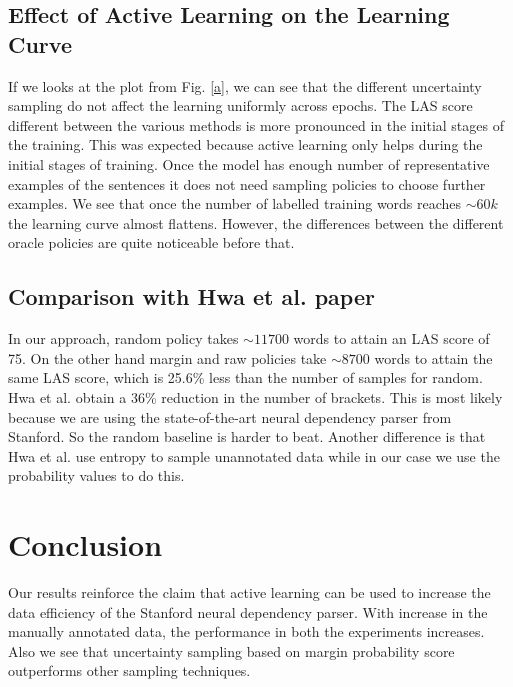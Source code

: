 \documentclass[11pt,letterpaper]{article}
\begin{document}
\subsection{Effect of Active Learning on the Learning Curve}
If we looks at the plot from Fig. \ref{a}, we can see that the different uncertainty sampling do not affect the learning uniformly across epochs. The LAS score different between the various methods is more pronounced in the initial stages of the training. This was expected because active learning only helps during the initial stages of training. Once the model has enough number of representative examples of the sentences it does not need sampling policies to choose further examples. We see that once the number of labelled training words reaches $\sim60k$ the learning curve almost flattens. However, the differences between the different oracle policies are quite noticeable before that.

\subsection{Comparison with Hwa et al. paper}
In our approach, random policy takes $\sim11700$ words to attain an LAS score of 75. On the other hand margin and raw policies take $\sim8700$ words to attain the same LAS score, which is 25.6\% less than the number of samples for random. Hwa et al. obtain a 36\% reduction in the number of brackets. This is most likely because we are using the state-of-the-art neural dependency parser from Stanford. So the random baseline is harder to beat. Another difference is that Hwa et al. use entropy to sample unannotated data while in our case we use the probability values to do this.

\section{Conclusion}
Our results reinforce the claim that active learning can be used to increase the data efficiency of the Stanford neural dependency parser. With increase in the manually annotated data, the performance in both the experiments increases. Also we see that uncertainty sampling based on margin probability score outperforms other sampling techniques.
\end{document}
